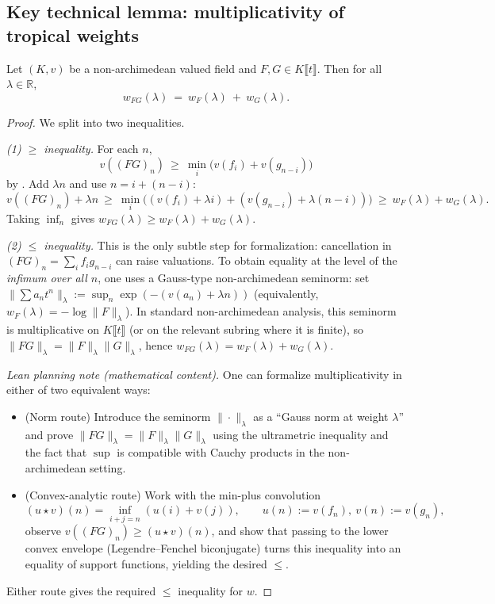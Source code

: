 \subsection{Key technical lemma: multiplicativity of tropical weights}

\begin{lemma}
  \label{lem:tropical_weight_mul}
  \leanok
  Let $(K,v)$ be a non-archimedean valued field and $F,G\in K\llbracket t\rrbracket$.
  Then for all $\lambda\in\mathbb{R}$,
  \[
    w_{FG}(\lambda)\ =\ w_F(\lambda)\ +\ w_G(\lambda).
  \]
\end{lemma}

\begin{proof}
  \leanok
  We split into two inequalities.

  \emph{(1) $\ge$ inequality.}
  For each $n$,
  \[
    v((FG)_n)\ \ge\ \min_{i}\big(v(f_i)+v(g_{n-i})\big)
  \]
  by . Add $\lambda n$ and use $n=i+(n-i)$:
  \[
    v((FG)_n)+\lambda n\ \ge\ \min_i \big((v(f_i)+\lambda i)+(v(g_{n-i})+\lambda(n-i))\big)
    \ \ge\ w_F(\lambda)+w_G(\lambda).
  \]
  Taking $\inf_n$ gives $w_{FG}(\lambda)\ge w_F(\lambda)+w_G(\lambda)$.

  \emph{(2) $\le$ inequality.}
  This is the only subtle step for formalization: cancellation in $(FG)_n=\sum_i f_i g_{n-i}$ can raise valuations.
  To obtain equality at the level of the \emph{infimum over all $n$}, one uses a Gauss-type non-archimedean seminorm:
  set $\|\sum a_n t^n\|_\lambda := \sup_n \exp(-(v(a_n)+\lambda n))$ (equivalently, $w_F(\lambda)=-\log \|F\|_\lambda$).
  In standard non-archimedean analysis, this seminorm is multiplicative on $K\llbracket t\rrbracket$ (or on the relevant
  subring where it is finite), so $\|FG\|_\lambda=\|F\|_\lambda\|G\|_\lambda$, hence $w_{FG}(\lambda)=w_F(\lambda)+w_G(\lambda)$.

  \emph{Lean planning note (mathematical content).}
  One can formalize multiplicativity in either of two equivalent ways:
  \begin{itemize}
    \item (Norm route) Introduce the seminorm $\|\cdot\|_\lambda$ as a “Gauss norm at weight $\lambda$” and prove
      $\|FG\|_\lambda=\|F\|_\lambda\|G\|_\lambda$ using the ultrametric inequality and the fact that $\sup$ is compatible
      with Cauchy products in the non-archimedean setting.
    \item (Convex-analytic route) Work with the min-plus convolution
      \[
        (u\star v)(n)=\inf_{i+j=n}(u(i)+v(j)),\qquad u(n):=v(f_n),\ v(n):=v(g_n),
      \]
      observe $v((FG)_n)\ge (u\star v)(n)$, and show that passing to the lower convex envelope
      (Legendre--Fenchel biconjugate) turns this inequality into an equality of support functions, yielding the desired $\le$.
  \end{itemize}
  Either route gives the required $\le$ inequality for $w$.
\end{proof}

